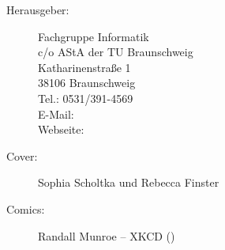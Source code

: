 
\begin{description}
\item[Herausgeber:]
	Fachgruppe Informatik\\
	c/o AStA der TU Braunschweig\\
	Katharinenstraße 1\\
	38106 Braunschweig\\
	Tel.: 0531/391-4569\\
	E-Mail: \\
	Webseite: \fginfoUrl
\item[Cover:] Sophia Scholtka und Rebecca Finster
\item[Comics:] Randall Munroe -- XKCD ()
\end{description}

